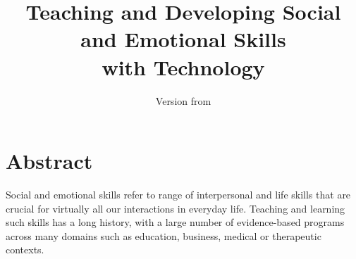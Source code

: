 \documentclass[prodmode,acmtochi]{acmsmall}
\begin{document}



\title{Teaching and Developing Social and Emotional Skills \\ with Technology} 
\author{Version from \affil{ \today, \currenttime }}
        

\maketitle

\section*{Abstract} 
Social and emotional skills refer to range of interpersonal and life skills that are crucial for virtually all our interactions in everyday life. Teaching and learning such skills has a long history, with a large number of evidence-based programs across many domains such as education, business, medical or therapeutic contexts. 
\end{document}
